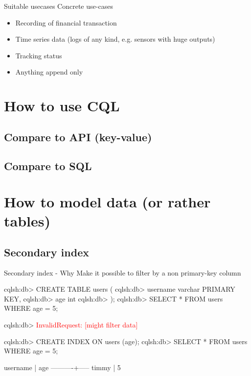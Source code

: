 \documentclass[10pt]{beamer}
\begin{document}
\begin{frame}{Suitable usecases}
  Concrete use-cases
  \begin{itemize}
    \item Recording of financial transaction
    \item Time series data (logs of any kind, e.g. sensors with huge outputs)
    \item Tracking status
    \item Anything append only
  \end{itemize}
\end{frame}

\section{How to use CQL}  %
\subsection{Compare to API (key-value)}
\subsection{Compare to SQL}

\section{How to model data (or rather tables)}  %

\subsection{Secondary index}  %

\begin{frame}[fragile]{Secondary index - Why}
  Make it possible to filter by a non primary-key column
  \begin{semiverbatim}
  cqlsh:db> CREATE TABLE users (
  cqlsh:db>  username varchar PRIMARY KEY,
  cqlsh:db>  age int
  cqlsh:db> );
  cqlsh:db> SELECT * FROM users WHERE age = 5;
  \end{semiverbatim}

  \begin{semiverbatim}
  cqlsh:db> \textcolor{red}{InvalidRequest: [might filter data]}
  \end{semiverbatim}

  \begin{semiverbatim}
  cqlsh:db> CREATE INDEX ON users (age);
  cqlsh:db> SELECT * FROM users WHERE age = 5;

   username | age
  ----------+-----
      timmy |   5
  \end{semiverbatim}
\end{frame}
\end{document}
